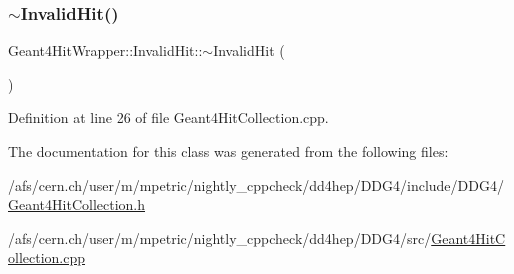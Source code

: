 \subsubsection{\texorpdfstring{$\sim$\+Invalid\+Hit()}{~InvalidHit()}}
{\footnotesize\ttfamily Geant4\+Hit\+Wrapper\+::\+Invalid\+Hit\+::$\sim$\+Invalid\+Hit (\begin{DoxyParamCaption}{ }\end{DoxyParamCaption})\hspace{0.3cm}{\ttfamily [virtual]}}



Definition at line 26 of file Geant4\+Hit\+Collection.\+cpp.



The documentation for this class was generated from the following files\+:\begin{DoxyCompactItemize}
\item 
/afs/cern.\+ch/user/m/mpetric/nightly\+\_\+cppcheck/dd4hep/\+D\+D\+G4/include/\+D\+D\+G4/\hyperlink{_geant4_hit_collection_8h}{Geant4\+Hit\+Collection.\+h}\item 
/afs/cern.\+ch/user/m/mpetric/nightly\+\_\+cppcheck/dd4hep/\+D\+D\+G4/src/\hyperlink{_geant4_hit_collection_8cpp}{Geant4\+Hit\+Collection.\+cpp}\end{DoxyCompactItemize}
